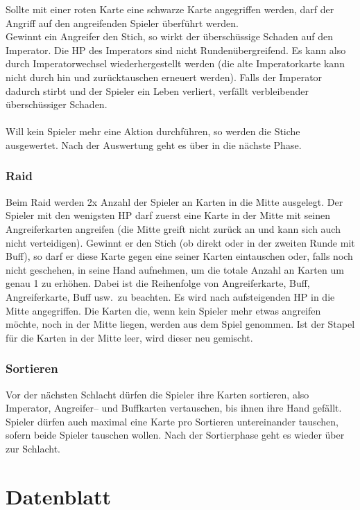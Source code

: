 \documentclass[a4paper,12pt]{article}
\numberwithin{equation}{section}
\begin{document}
Sollte mit einer roten Karte eine schwarze Karte angegriffen werden, darf der Angriff auf den angreifenden Spieler überführt werden.\\\indent
Gewinnt ein Angreifer den Stich, so wirkt der überschüssige Schaden auf den Imperator.
Die HP des Imperators sind nicht Rundenübergreifend.
Es kann also durch Imperatorwechsel wiederhergestellt werden (die alte Imperatorkarte kann nicht durch hin und zurücktauschen erneuert werden).
Falls der Imperator dadurch stirbt und der Spieler ein Leben verliert, verfällt verbleibender überschüssiger Schaden.
\\\\
Will kein Spieler mehr eine Aktion durchführen, so werden die Stiche ausgewertet.
Nach der Auswertung geht es über in die nächste Phase.

\subsubsection{Raid}
Beim Raid werden 2x Anzahl der Spieler an Karten in die Mitte ausgelegt.
Der Spieler mit den wenigsten HP darf zuerst eine Karte in der Mitte mit seinen Angreiferkarten angreifen (die Mitte greift nicht zurück an und kann sich auch nicht verteidigen).
Gewinnt er den Stich (ob direkt oder in der zweiten Runde mit Buff), so darf er diese Karte gegen eine seiner Karten eintauschen oder, falls noch nicht geschehen, in seine Hand aufnehmen, um die totale Anzahl an Karten um genau 1 zu erhöhen.
Dabei ist die Reihenfolge von Angreiferkarte, Buff, Angreiferkarte, Buff usw.\ zu beachten.
Es wird nach aufsteigenden HP in die Mitte angegriffen.
Die Karten die, wenn kein Spieler mehr etwas angreifen möchte, noch in der Mitte liegen, werden aus dem Spiel genommen.
Ist der Stapel für die Karten in der Mitte leer, wird dieser neu gemischt.

\subsubsection{Sortieren}
Vor der nächsten Schlacht dürfen die Spieler ihre Karten sortieren, also Imperator, Angreifer-- und Buffkarten vertauschen, bis ihnen ihre Hand gefällt.
Spieler dürfen auch maximal eine Karte pro Sortieren untereinander tauschen, sofern beide Spieler tauschen wollen.
Nach der Sortierphase geht es wieder über zur Schlacht.

\newpage
\section{Datenblatt}
\end{document}
